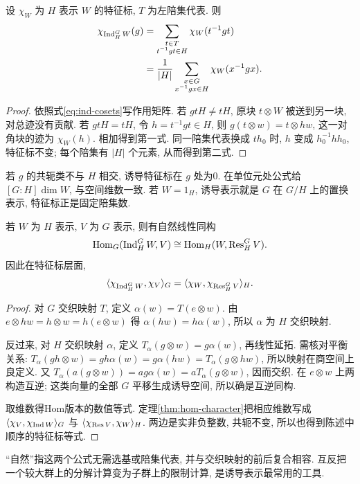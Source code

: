 \begin{theorem}\label{thm:ind-char}
设 $\chi_W$ 为 $H$ 表示 $W$ 的特征标, $T$ 为左陪集代表. 则
\begin{align*}
 \chi_{\operatorname{Ind}_H^G W}(g)
 &=\sum_{\substack{t\in T\\t^{-1}gt\in H}}\chi_W(t^{-1}gt)\\
 &=\frac1{|H|}\sum_{\substack{x\in G\\x^{-1}gx\in H}}\chi_W(x^{-1}gx).
\end{align*}
\end{theorem}
\begin{proof}
依照式\eqref{eq:ind-cosets}写作用矩阵. 若 $gtH\ne tH$, 原块 $t\otimes W$ 被送到另一块, 对总迹没有贡献. 若 $gtH=tH$, 令 $h=t^{-1}gt\in H$, 则 $g(t\otimes w)=t\otimes hw$, 这一对角块的迹为 $\chi_W(h)$. 相加得到第一式. 同一陪集代表换成 $th_0$ 时, $h$ 变成 $h_0^{-1}hh_0$, 特征标不变; 每个陪集有 $|H|$ 个元素, 从而得到第二式.
\end{proof}
若 $g$ 的共轭类不与 $H$ 相交, 诱导特征标在 $g$ 处为0. 在单位元处公式给 $[G:H]\dim W$, 与空间维数一致. 若 $W=1_H$, 诱导表示就是 $G$ 在 $G/H$ 上的置换表示, 特征标正是固定陪集数.

\begin{theorem}[Frobenius互反]\label{thm:reciprocity}
若 $W$ 为 $H$ 表示, $V$ 为 $G$ 表示, 则有自然线性同构
\[
 \operatorname{Hom}_G(\operatorname{Ind}_H^G W,V)\cong\operatorname{Hom}_H(W,\operatorname{Res}_H^G V).
\]
因此在特征标层面,
\[
 \langle \chi_{\operatorname{Ind}_H^G W},\chi_V\rangle_G
 =\langle \chi_W,\chi_{\operatorname{Res}_H^G V}\rangle_H.
\]
\end{theorem}
\begin{proof}
对 $G$ 交织映射 $T$, 定义 $\alpha(w)=T(e\otimes w)$. 由 $e\otimes hw=h\otimes w=h(e\otimes w)$ 得 $\alpha(hw)=h\alpha(w)$, 所以 $\alpha$ 为 $H$ 交织映射.

反过来, 对 $H$ 交织映射 $\alpha$, 定义 $T_\alpha(g\otimes w)=g\alpha(w)$, 再线性延拓. 需核对平衡关系: $T_\alpha(gh\otimes w)=gh\alpha(w)=g\alpha(hw)=T_\alpha(g\otimes hw)$, 所以映射在商空间上良定义. 又 $T_\alpha(a(g\otimes w))=ag\alpha(w)=aT_\alpha(g\otimes w)$, 因而交织. 在 $e\otimes w$ 上两构造互逆; 这类向量的全部 $G$ 平移生成诱导空间, 所以确是互逆同构.

取维数得Hom版本的数值等式. 定理\ref{thm:hom-character}把相应维数写成 $\langle \chi_V,\chi_{\operatorname{Ind} W}\rangle_G$ 与 $\langle \chi_{\operatorname{Res} V},\chi_W\rangle_H$. 两边是实非负整数, 共轭不变, 所以也得到陈述中顺序的特征标等式.
\end{proof}
“自然”指这两个公式无需选基或陪集代表, 并与交织映射的前后复合相容. 互反把一个较大群上的分解计算变为子群上的限制计算, 是诱导表示最常用的工具.

